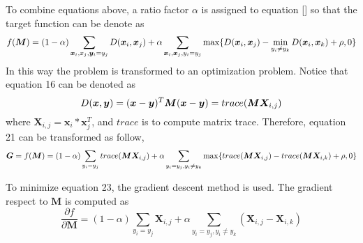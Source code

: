  To combine equations above, a ratio factor $\alpha$ is assigned to equation [] so that the target function can be denote as 
  \begin{equation}
 f(\bm{M}) = (1-\alpha)\sum_{\bm{x}_i,x_j,\bm{y}_i=y_j} D(\bm{x}_i,\bm{x}_j) + \\ 
 \alpha \sum_{\bm{x}_i,\bm{x}_j,y_i=y_j}\max\{{D(\bm{x}_i,\bm{x}_j)-\min_{y_i\ne y_k}{D(\bm{x}_i,\bm{x}_k)}+\rho,0}\}
 \end{equation}
 In this way the problem is transformed to an optimization problem. Notice that equation 16 can be denoted as 
 \begin{equation}
 D(\bm{x},\bm{y}) = (\bm{x} - \bm{y})^T\bm{M}(\bm{x} - \bm{y})\\ = trace(\bm{M}\bm{X}_{i,j})
 \end{equation}
 where $\bm{X}_{i,j} = \bm{x}_i*\bm{x}_j^T$, and $trace$ is to compute matrix trace. Therefore, equation 21 can be transformed as follow,
 \begin{equation}
 \bm{G} = f(\bm{M}) = (1-\alpha)\sum_{y_i = y_j}trace(\bm{M}\bm{X}_{i,j}) \\
  + \alpha \sum_{y_i = y_j,y_i\ne y_k}\max\{trace(\bm{M}\bm{X}_{i,j}) - trace(\bm{M}\bm{X}_{i,k} )+ \rho,0\}
 \end{equation}
 
 To minimize equation 23, the gradient descent method is used. The gradient respect to $\bm{M}$ is computed as
 \begin{equation}
 \frac{\partial f}{\partial \bm{M}} = (1-\alpha) \sum_{y_i = y_j} \bm{X}_{i,j} 
 + \alpha \sum_{y_i = y_j, y_i \ne y_k}(\bm{X}_{i,j} - \bm{X}_{i,k})
 \end{equation}
 
